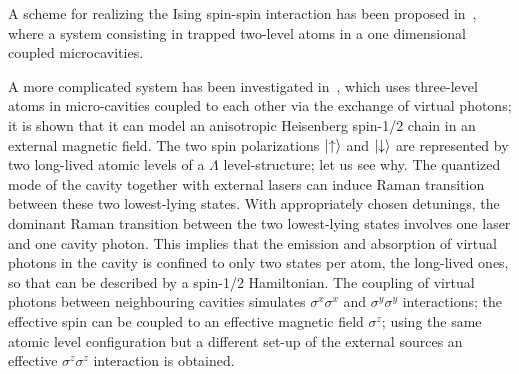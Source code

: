 A scheme for realizing the Ising spin-spin interaction has been proposed in~\cite{LiGuGong}, where a system consisting in trapped two-level atoms in a one dimensional coupled microcavities. 

A more complicated system has been investigated in~\cite{Hartmann_XYZ}, which uses three-level atoms in micro-cavities coupled to each other via the exchange of virtual photons; it is shown that it can model an anisotropic Heisenberg spin-1/2 chain in an external magnetic field. The two spin polarizations $\ket{\uparrow}$ and $\ket{\downarrow}$ are represented by two long-lived atomic levels of a $\Lambda$ level-structure; let us see why. The quantized mode of the cavity together with external lasers can induce Raman transition between these two lowest-lying states.  With appropriately chosen detunings, the dominant Raman transition between the two lowest-lying states involves one laser and one cavity photon. This implies that the emission and absorption of virtual photons in the cavity is confined to only two states per atom, the long-lived ones, so that can be described by a spin-1/2 Hamiltonian. The coupling of virtual photons between neighbouring cavities simulates $\sigma^x\sigma^x$ and $\sigma^y\sigma^y$ interactions; the effective spin can be coupled to an effective magnetic field $\sigma^z$; using the same atomic level configuration but a different set-up of the external sources an effective $\sigma^z\sigma^z$ interaction is obtained.